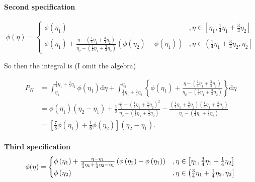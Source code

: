 \documentclass{article}
\begin{document}
\begin{solution}
\paragraph{Second specification}

\[
\ensuremath{\phi(\eta)=\begin{cases}
\phi\left(\eta_{1}\right) & ,\eta\in\left[\eta_{1},\frac{1}{4}\eta_{1}+\frac{3}{4}\eta_{2}\right]\\
\phi\left(\eta_{1}\right)+\frac{\eta-\left(\frac{1}{4}\eta_{1}+\frac{3}{4}\eta_{2}\right)}{\eta_{2}-\left(\frac{1}{4}\eta_{1}+\frac{3}{4}\eta_{2}\right)}\left(\phi\left(\eta_{2}\right)-\phi\left(\eta_{1}\right)\right) & ,\eta\in\left(\frac{1}{4}\eta_{1}+\frac{3}{4}\eta_{2},\eta_{2}\right]
\end{cases}}
\]

So then the integral is (I omit the algebra)

\[
\begin{aligned}P_{K} & =\int_{\eta_{1}}^{\frac{1}{4}\eta_{1}+\frac{3}{4}\eta_{2}}\phi\left(\eta_{1}\right)\mathrm{d}\eta+\int_{\frac{1}{4}\eta_{1}+\frac{3}{4}\eta_{2}}^{\eta_{2}}\left\{ \phi\left(\eta_{1}\right)+\frac{\eta-\left(\frac{1}{4}\eta_{1}+\frac{3}{4}\eta_{2}\right)}{\eta_{2}-\left(\frac{1}{4}\eta_{1}+\frac{3}{4}\eta_{2}\right)}\right\} \mathrm{d}\eta\\
 & =\phi\left(\eta_{1}\right)\left(\eta_{2}-\eta_{1}\right)+\frac{1}{2}\frac{\eta_{2}^{2}-\left(\frac{1}{4}\eta_{1}+\frac{3}{4}\eta_{2}\right)^{2}}{\eta_{2}-\left(\frac{1}{4}\eta_{1}+\frac{3}{4}\eta_{2}\right)}-\frac{\left(\frac{1}{4}\eta_{1}+\frac{3}{4}\eta_{2}\right)\left(\frac{1}{4}\eta_{1}+\frac{3}{4}\eta_{2}\right)}{\eta_{2}-\left(\frac{1}{4}\eta_{1}+\frac{3}{4}\eta_{2}\right)}\\
 & =\left[\frac{7}{8}\phi\left(\eta_{1}\right)+\frac{1}{8}\phi\left(\eta_{2}\right)\right]\left(\eta_{2}-\eta_{1}\right).
\end{aligned}
\]


\paragraph{Third specification 
\[
\ensuremath{\phi(\eta)=\protect\begin{cases}
\phi\left(\eta_{1}\right)+\frac{\eta-\eta_{1}}{\frac{3}{4}\eta_{1}+\frac{1}{4}\eta_{2}-\eta_{1}}\left(\phi\left(\eta_{2}\right)-\phi\left(\eta_{1}\right)\right) & ,\eta\in\left[\eta_{1},\frac{3}{4}\eta_{1}+\frac{1}{4}\eta_{2}\right]\protect\\
\phi\left(\eta_{2}\right) & ,\eta\in\left(\frac{3}{4}\eta_{1}+\frac{1}{4}\eta_{2},\eta_{2}\right]
\protect\end{cases}}
\]
}


\end{solution}
\end{document}
